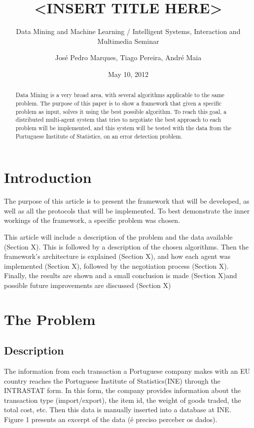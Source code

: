 \documentclass{llncs}
\begin{document}
\title{<INSERT TITLE HERE>}
\subtitle{Data Mining and Machine Learning / Intelligent Systems, Interaction and Multimedia Seminar}
\author{José Pedro Marques, Tiago Pereira, André Maia}
\date{May 10, 2012}
\maketitle

\begin{abstract}
Data Mining is a very broad area, with several algorithms applicable to the same problem. The purpose of this paper is to show a framework that given a specific problem as input, solves it using the best possible algorithm. To reach this goal, a distributed multi-agent system that
tries to negotiate the best approach to each problem will be implemented, and this system will be tested with the data from the Portuguese Institute of Statistics, on an error detection problem.
\end{abstract}

\section{Introduction}

The purpose of this article is to present the framework that will be
developed, as well as all the protocols that will be implemented. To best demonstrate the inner workings of the framework, a specific problem
was chosen.

This article will include a description of the problem and the data available (Section X). This is followed by a description of the chosen algorithms. Then the framework's architecture is explained (Section X), and how each agent was implemented (Section X), followed by the negotiation process (Section X). Finally, the results are shown and a small conclusion is made (Section X)and possible future improvements are discussed (Section X)


\section{The Problem}

\subsection{Description}

The information from each transaction a Portuguese company makes with an EU country reaches the Portuguese Institute of Statistics(INE) through the INTRASTAT form. In this form, the company provides information  about the transaction type (import/export), the item id, the weight of goods traded, the total cost, etc. Then this data is manually inserted into a database at INE. Figure 1 presents an excerpt of the data (é preciso perceber os dados).
\end{document}
